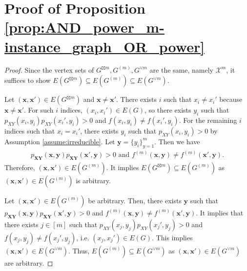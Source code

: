 \documentclass[journal, onecolumn, draftcls]{IEEEtran}
\theoremstyle{definition}
\newcommand{\calX}{\mathcal{X}}
\newcommand{\bfy}{\mathbf{y}}
\newcommand{\bfX}{\mathbf{X}}
\newcommand{\bfY}{\mathbf{Y}}
\newcommand{\bfx}{\mathbf{x}}
\begin{document}
 

\section{Proof of Proposition \ref{prop:AND_power_m-instance_graph_OR_power}}
 


 \label{app:pf_prop5}





\begin{proof}Since the vertex sets of $G^{\boxtimes m}, G^{(m)}, G^{\lor m}$ are the same, namely $\calX^m$, it suffices to show  $E(G^{\boxtimes m})\subseteq E(G^{(m)})\subseteq E(G^{\lor m})$. 

Let $(\bfx,\bfx')\in E(G^{\boxtimes m})$ and $\bfx\ne \bfx'$. There exists $  i$ such that  $x_{  i}\ne x_{  i}'$ because  
  $\bfx\ne \bfx'$. For such $i$ indices, $(x_i,x_i')\in E(G)$, so there exists $y_i$ such that  $p_{XY}(x_i,y_i)p_{XY}(x_i',y_i)>0$ and $f(x_i,y_i)\ne f(x_i',y_i)$.  For the remaining $i$ indices such that  $x_i= x_i'$, there exists $y_i$ such that  $p_{XY}(x_i,y_i)>0$ by Assumption \ref{assume:irreducible}. Let $\bfy = \{y_i\}_{y=1}^m$. Then we have
\begin{align*}
p_{\bfX\bfY}(\bfx ,\bfy)p_{\bfX\bfY}(\bfx' ,\bfy) > 0\text{ and } f^{(m)}(\bfx ,\bfy) \neq f^{(m)}(\bfx' ,\bfy).
\end{align*}
Therefore, $(\bfx,\bfx')\in E(G^{(m)})$. It implies $E(G^{\boxtimes m})\subseteq E(G^{(m)})$ as  $(\bfx,\bfx')\in E(G^{(m)})$ is arbitrary.



Let $(\bfx,\bfx')\in E(G^{(m)})$ be arbitrary. Then, there exists $\bfy$ such that $ p_{\bfX\bfY}(\bfx ,\bfy)p_{\bfX\bfY}(\bfx' ,\bfy) > 0$ and   $f^{(m)}(\bfx ,\bfy) \neq f^{(m)}(\bfx' ,\bfy)$. It implies that  there exists $j \in [m]$ such that $p_{XY}(x_{j},y_j) p_{XY}(x_{j}', y_j) > 0$ and $f(x_{j},y_j) \neq f(x_{j}',y_j)$, i.e. $(x_j,x_j')\in E(G).$ This implies $(\bfx,\bfx')\in E(G^{\lor m})$. Thus, $E(G^{(m)}) \subseteq  E(G^{\lor m})$  as $(\bfx,\bfx')\in E(G^{\lor m})$ are   arbitrary.
\end{proof}




\end{document}
